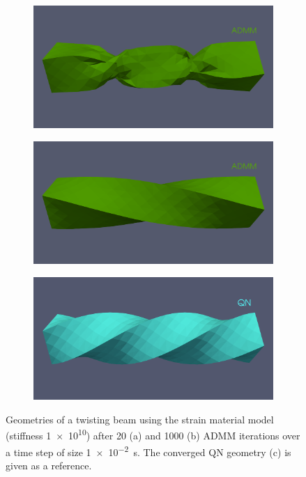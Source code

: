 \begin{figure}
    \begin{subfigure}{0.49\textwidth}
    \includegraphics[width=\textwidth, trim={0 5.0cm 0 2.5cm}, clip]{figures/twisted_beam_bad_state_admm.png}
    \end{subfigure}
    \begin{subfigure}{0.49\textwidth}
    \includegraphics[width=\textwidth, trim={0 5.0cm 0 2.5cm}, clip]{figures/twisted_beam_artificial_state_admm.png}
    \end{subfigure}
    \centering
    \par\medskip
    \begin{subfigure}{0.49\textwidth}
    \includegraphics[width=\textwidth, trim={0 5.0cm 0 2.5cm}, clip]{figures/twisted_beam_qn.png}
    \end{subfigure}
    \caption{Geometries of a twisting beam using the strain material model (stiffness \num{1e10}) after 20 (a) and 1000 (b) ADMM iterations over a time step of size 
        \SI{1e-2}{\second}. The converged QN geometry (c) is given as a reference.}
    \label{fig:strain-beam-twist-admm-geometries}
\end{figure}

